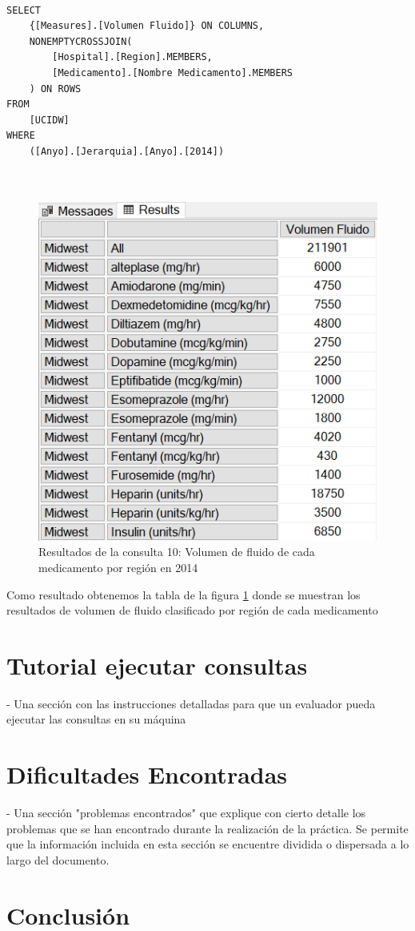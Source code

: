 \documentclass{article}
\begin{document}
\begin{lstlisting}[style=ddlstyle, label=lst:consulta10,caption=Consulta 10: Volumen de fluido de cada medicamento por region en 2014]
	
SELECT 
	{[Measures].[Volumen Fluido]} ON COLUMNS, 
	NONEMPTYCROSSJOIN(
		[Hospital].[Region].MEMBERS, 
		[Medicamento].[Nombre Medicamento].MEMBERS
	) ON ROWS
FROM 
	[UCIDW]
WHERE 
	([Anyo].[Jerarquia].[Anyo].[2014])

	
\end{lstlisting}


\begin{figure}[H]
	\centering
	\includegraphics[width=0.4\linewidth]{images/consulta10.png}
	\caption{Resultados de la consulta 10: Volumen de fluido de cada medicamento por región en 2014}
	\label{fig:consulta10}
\end{figure}

Como resultado obtenemos la tabla de la figura \ref{fig:consulta10} donde se muestran los resultados de volumen de fluido clasificado por región de cada medicamento

\section{Tutorial ejecutar consultas}


	 - Una sección con las instrucciones detalladas para que un evaluador pueda ejecutar las consultas en su máquina
	\section{Dificultades Encontradas}
	\label{sec:dificultades_encontradas}
	  - Una sección "problemas encontrados" que explique con cierto detalle los problemas que se han encontrado durante la realización de la práctica. Se permite que la información incluida en esta sección se encuentre dividida o dispersada a lo largo del documento. 

	\section{Conclusión}
	\label{sec:conclusion}
	
\end{document}
